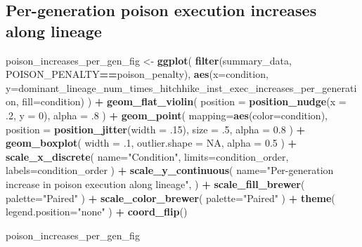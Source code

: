 \documentclass[]{book}
\newenvironment{Shaded}{\begin{snugshade}}{\end{snugshade}}
\newcommand{\DataTypeTok}[1]{\textcolor[rgb]{0.13,0.29,0.53}{#1}}
\newcommand{\DecValTok}[1]{\textcolor[rgb]{0.00,0.00,0.81}{#1}}
\newcommand{\FloatTok}[1]{\textcolor[rgb]{0.00,0.00,0.81}{#1}}
\newcommand{\KeywordTok}[1]{\textcolor[rgb]{0.13,0.29,0.53}{\textbf{#1}}}
\newcommand{\NormalTok}[1]{#1}
\newcommand{\OperatorTok}[1]{\textcolor[rgb]{0.81,0.36,0.00}{\textbf{#1}}}
\newcommand{\OtherTok}[1]{\textcolor[rgb]{0.56,0.35,0.01}{#1}}
\newcommand{\StringTok}[1]{\textcolor[rgb]{0.31,0.60,0.02}{#1}}
\begin{document}
\hypertarget{per-generation-poison-execution-increases-along-lineage}{%
\subsection{Per-generation poison execution increases along lineage}\label{per-generation-poison-execution-increases-along-lineage}}

\begin{Shaded}
\begin{Highlighting}[]
\NormalTok{poison_increases_per_gen_fig <-}\StringTok{ }\KeywordTok{ggplot}\NormalTok{(}
    \KeywordTok{filter}\NormalTok{(summary_data, POISON_PENALTY}\OperatorTok{==}\NormalTok{poison_penalty),}
    \KeywordTok{aes}\NormalTok{(}\DataTypeTok{x=}\NormalTok{condition, }\DataTypeTok{y=}\NormalTok{dominant_lineage_num_times_hitchhike_inst_exec_increases_per_generation, }\DataTypeTok{fill=}\NormalTok{condition)}
\NormalTok{  ) }\OperatorTok{+}
\StringTok{  }\KeywordTok{geom_flat_violin}\NormalTok{(}
    \DataTypeTok{position =} \KeywordTok{position_nudge}\NormalTok{(}\DataTypeTok{x =} \FloatTok{.2}\NormalTok{, }\DataTypeTok{y =} \DecValTok{0}\NormalTok{),}
    \DataTypeTok{alpha =} \FloatTok{.8}
\NormalTok{  ) }\OperatorTok{+}
\StringTok{  }\KeywordTok{geom_point}\NormalTok{(}
    \DataTypeTok{mapping=}\KeywordTok{aes}\NormalTok{(}\DataTypeTok{color=}\NormalTok{condition),}
    \DataTypeTok{position =} \KeywordTok{position_jitter}\NormalTok{(}\DataTypeTok{width =} \FloatTok{.15}\NormalTok{),}
    \DataTypeTok{size =} \FloatTok{.5}\NormalTok{,}
    \DataTypeTok{alpha =} \FloatTok{0.8}
\NormalTok{  ) }\OperatorTok{+}
\StringTok{  }\KeywordTok{geom_boxplot}\NormalTok{(}
    \DataTypeTok{width =} \FloatTok{.1}\NormalTok{,}
    \DataTypeTok{outlier.shape =} \OtherTok{NA}\NormalTok{,}
    \DataTypeTok{alpha =} \FloatTok{0.5}
\NormalTok{  ) }\OperatorTok{+}
\StringTok{  }\KeywordTok{scale_x_discrete}\NormalTok{(}
    \DataTypeTok{name=}\StringTok{"Condition"}\NormalTok{,}
    \DataTypeTok{limits=}\NormalTok{condition_order,}
    \DataTypeTok{labels=}\NormalTok{condition_order}
\NormalTok{  ) }\OperatorTok{+}
\StringTok{  }\KeywordTok{scale_y_continuous}\NormalTok{(}
    \DataTypeTok{name=}\StringTok{"Per-generation increase in poison execution along lineage"}\NormalTok{,}
\NormalTok{  ) }\OperatorTok{+}
\StringTok{  }\KeywordTok{scale_fill_brewer}\NormalTok{(}
    \DataTypeTok{palette=}\StringTok{"Paired"}
\NormalTok{  ) }\OperatorTok{+}
\StringTok{  }\KeywordTok{scale_color_brewer}\NormalTok{(}
    \DataTypeTok{palette=}\StringTok{"Paired"}
\NormalTok{  ) }\OperatorTok{+}
\StringTok{  }\KeywordTok{theme}\NormalTok{(}
    \DataTypeTok{legend.position=}\StringTok{"none"}
\NormalTok{  ) }\OperatorTok{+}
\StringTok{  }\KeywordTok{coord_flip}\NormalTok{()}

\NormalTok{poison_increases_per_gen_fig}
\end{Highlighting}
\end{Shaded}
\end{document}
